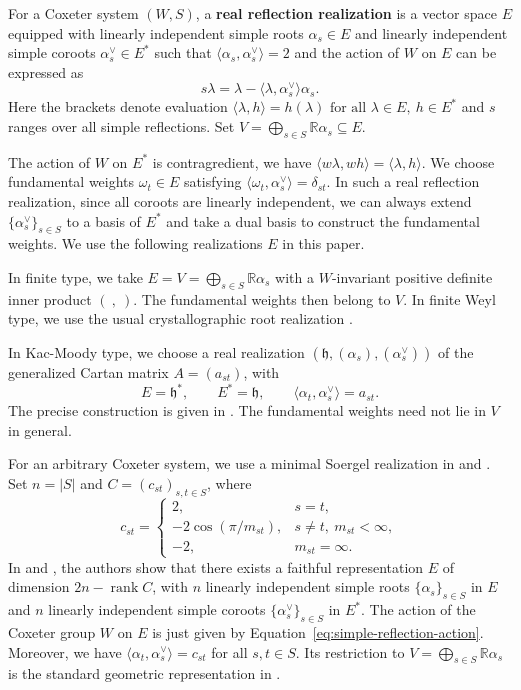 \documentclass[11pt,a4paper]{article}
\theoremstyle{definition}
\theoremstyle{remark}
\newcommand{\R}{\mathbb R}
\numberwithin{equation}{section}
\begin{document}
For a Coxeter system $(W,S)$, a \textbf{real reflection realization} is a vector space $E$ equipped with linearly independent simple roots $\alpha_s\in E$ and linearly independent simple coroots $\alpha_s^\vee\in E^*$ such that $\langle\alpha_s,\alpha_s^{\vee}\rangle=2$ and the action of $W$ on $E$ can be expressed as
\begin{equation}\label{eq:simple-reflection-action}
 s\lambda=\lambda-\langle\lambda,\alpha_s^\vee\rangle\alpha_s.
\end{equation}
Here the brackets denote evaluation $\langle\lambda,h\rangle=h(\lambda) \text{ for all } \lambda\in E,\ h\in E^*$ and $s$ ranges over all simple reflections. Set $V=\bigoplus_{s\in S}\R\alpha_s\subseteq E$.

The action of $W$ on $E^*$ is contragredient, we have
$\langle w\lambda,wh\rangle=\langle\lambda,h\rangle$.
We choose fundamental weights $\omega_t\in E$ satisfying
$\langle\omega_t,\alpha_s^\vee\rangle=\delta_{st}$. In such a real reflection realization, since all coroots are linearly independent, we can always extend $\{\alpha_s^\vee\}_{s\in S}$ to a basis of $E^*$ and take a dual basis to construct the fundamental weights. We use the following realizations $E$ in this paper.

In finite type, we take $E=V=\bigoplus_{s\in S}\R\alpha_s$ with a $W$-invariant positive definite inner product $(\ ,\ )$. The fundamental weights then belong to $V$. In finite Weyl type, we use the usual crystallographic root realization \cite{Kac}.

In Kac-Moody type, we choose a real realization
$(\mathfrak h,(\alpha_s),(\alpha_s^\vee))$ of the generalized Cartan matrix $A=(a_{st})$, with
\[
 E=\mathfrak h^*,\qquad E^*=\mathfrak h,
 \qquad \langle\alpha_t,\alpha_s^\vee\rangle=a_{st}.
\]
The precise construction is given in \cite{Kac}. The fundamental weights need not lie in $V$ in general. 

For an arbitrary Coxeter system, we use a minimal Soergel realization in \cite[Section~2]{SW} and \cite[Chapter~2]{RicheLectures}. Set $n=|S|$ and $C=(c_{st})_{s,t\in S}$, where
\begin{equation}\label{eq:coxeter-realization}
c_{st}=
\begin{cases}
2, & s=t,\\
-2\cos(\pi/m_{st}), & s\ne t,\ m_{st}<\infty,\\
-2, & m_{st}=\infty.
\end{cases}
\end{equation}
In \cite{SW} and \cite[Chapter~2, \S1.2.2]{RicheLectures}, the authors show that there exists a faithful representation $E$ of dimension $2n-\operatorname{rank}C$, with $n$ linearly independent simple roots $\{\alpha_s\}_{s\in S}$ in $E$ and $n$ linearly independent simple coroots $\{\alpha_s^\vee\}_{s\in S}$ in $E^*$. The action of the Coxeter group $W$ on $E$ is just given by Equation~\eqref{eq:simple-reflection-action}. Moreover, we have $\langle\alpha_t,\alpha_s^\vee\rangle=c_{st}$ for all $s,t\in S$. Its restriction to $V=\bigoplus_{s\in S}\mathbb R\alpha_s$ is the standard geometric representation in \cite{Kac}. 
\end{document}
